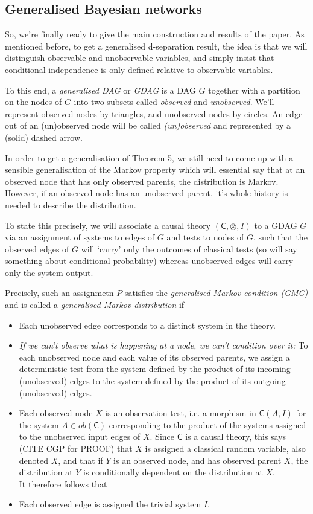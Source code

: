 \documentclass[11pt, oneside]{article}   	%
\begin{document}
\subsection{Generalised Bayesian networks}

So, we're finally ready to give the main construction and results of the paper. As mentioned before, to get a generalised d-separation result, the idea is that we will distinguish observable and unobservable variables, and simply insist that conditional independence is only defined relative to observable variables.

To this end, a \emph{generalised DAG} or \emph{GDAG} is a DAG $G$ together with a partition on the nodes of $G$ into two subsets called \emph{observed} and \emph{unobserved}. We'll represent observed nodes by triangles, and unobserved nodes by circles. An edge out of an (un)observed node will be called \emph{(un)observed} and represented by a (solid) dashed arrow. 

In order to get a generalisation of Theorem 5, we still need to come up with a sensible generalisation of the Markov property which will essential say that at an observed node that has only observed parents, the distribution is Markov. However, if an observed node has an unobserved parent, it's whole history is needed to describe the distribution. 

To state this precisely, we will associate a causal theory $(\mathsf C, \otimes, I)$ to a GDAG $G$  via an assignment of systems to edges of $G$ and tests to nodes of $G$, such that the observed edges of $G$ will `carry' only the outcomes of classical tests (so will say something about conditional probability) whereas unobserved edges will carry only the system output.

Precisely, such an assignmetn $P$ satisfies the \emph{generalised Markov condition (GMC)} and is called a \emph{generalised Markov distribution} if

\begin{itemize}

\item Each unobserved edge corresponds to a distinct system in the theory.
\item \emph{If we can't observe what is happening at a node, we can't condition over it:}
To each unobserved node and each value of its observed parents, we assign a deterministic test from the system defined by the product of its incoming (unobserved) edges to the system defined by the product of its outgoing (unobserved) edges. 
\item Each observed node $X$ is an observation test, i.e. a morphism in $\mathsf C(A, I)$ for the system $A \in ob( \mathsf C)$ corresponding to the product of the systems assigned to the unobserved input edges of $X$. Since $\mathsf C$ is a causal theory, this says (CITE CGP for PROOF) that $X$ is assigned a classical random variable, also denoted $X$, and that if $Y$ is an observed node, and has observed parent $X$, the distribution at $Y$ is conditionally dependent on the distribution at $X$.\\
It therefore follows that
\item Each observed edge is assigned the trivial system $I$.
\end{itemize}
\end{document}
